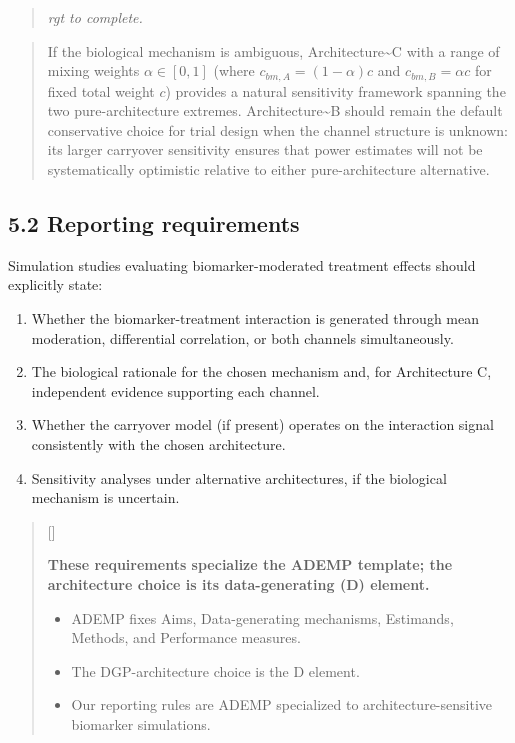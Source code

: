 \documentclass[
  11pt,
]{article}
\newcounter{pgraph}
\newenvironment{bullets}{%
  \stepcounter{pgraph}%
  \begin{quote}\small\sffamily\color[gray]{0.30}%
  {\normalfont\scriptsize\color[gray]{0.58}[\thepgraph]\enspace}}{%
  \end{quote}}
\newenvironment{rgt}{%
  \begin{quote}\small\itshape\color[RGB]{20,60,160}}{%
  \end{quote}}
\newenvironment{orig}{%
  \begin{quote}\normalsize\color[gray]{0.55}}{%
  \end{quote}}
\begin{document}
\begin{rgt}
rgt to complete.

\end{rgt}

\begin{orig}
If the biological mechanism is ambiguous, Architecture\textasciitilde C
with a range of mixing weights \(\alpha \in [0, 1]\) (where
\(c_{bm,A} = (1-\alpha) c\) and \(c_{bm,B} = \alpha c\) for fixed total
weight \(c\)) provides a natural sensitivity framework spanning the two
pure-architecture extremes. Architecture\textasciitilde B should remain
the default conservative choice for trial design when the channel
structure is unknown: its larger carryover sensitivity ensures that
power estimates will not be systematically optimistic relative to either
pure-architecture alternative.

\end{orig}

\subsection{5.2 Reporting requirements}

Simulation studies evaluating biomarker-moderated treatment effects
should explicitly state:

\begin{enumerate}
\item Whether the biomarker-treatment interaction is generated through
  mean moderation, differential correlation, or both channels
  simultaneously.
\item The biological rationale for the chosen mechanism and,
  for Architecture C, independent evidence supporting each
  channel.
\item Whether the carryover model (if present) operates on the
  interaction signal consistently with the chosen architecture.
\item Sensitivity analyses under alternative architectures, if the
  biological mechanism is uncertain.
\end{enumerate}

\begin{bullets}

\textbf{These requirements specialize the ADEMP template; the
architecture choice is its data-generating (D) element.}

\begin{itemize}\setlength{\itemsep}{2pt}\setlength{\parskip}{0pt}
\item ADEMP fixes Aims, Data-generating mechanisms, Estimands,
Methods, and Performance measures.
\item The DGP-architecture choice is the D element.
\item Our reporting rules are ADEMP specialized to
architecture-sensitive biomarker simulations.
\end{itemize}

\end{bullets}
\end{document}
